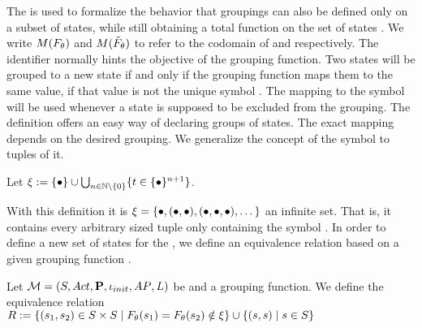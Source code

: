 \documentclass[preview]{standalone}
\begin{document}
The \grpfctsubN is used to formalize the behavior that groupings can also be defined only on a subset of states, while still obtaining a total function on the set of states \states. We write $M({F_{{\theta}}})$ and $M({\tilde{F}_{{\theta}}})$ to refer to the codomain of \grpfct and \grpfctsub respectively. The identifier \viewppty normally hints the objective of the grouping function. Two states will be grouped to a new state if and only if the grouping function maps them to the same value, if that value is not the unique symbol \remelem. The mapping to the symbol \remelem will be used whenever a state is supposed to be excluded from the grouping. The definition offers an easy way of declaring groups of states. The exact mapping depends on the desired grouping. We generalize the concept of the symbol \remelem to tuples of it. 

\begin{definition}
	Let ${\xi} := \{{\bullet}\} \cup \bigcup_{n \in {\mathbb{N}} \setminus \{0\}} \{t \in \{{\bullet}\}^{n+1}\}$.
\end{definition}

With this definition it is ${\xi} = \{{\bullet}, ({\bullet}, {\bullet}), ({\bullet}, {\bullet}, {\bullet}), \dots\}$ an infinite set. That is, it contains every arbitrary sized tuple only containing the symbol \remelem. In order to define a new set of states for the \viewN, we define an equivalence relation \eqrelview based on a given grouping function \grpfct.

\begin{definition}
	Let ${{{\mathcal{M}}}} = {{({S}, {Act}, {\textbf{P}}, {\iota_{init}}, {AP}, {L})}}$ be \achgphN and \grpfct a grouping function. We define the equivalence relation ${R} :=\{ ({s}_1, {s}_2) \in {S} \times {S} \mid {F_{\ensuremath{{\theta}}}}({s}_1) = {F_{{\theta}}}({s}_2) \notin {\xi}\} \cup \{({s}, {s})  \mid {s} \in {S}\}$
	
	\label{def:eqrelview}
\end{definition}
\end{document}
